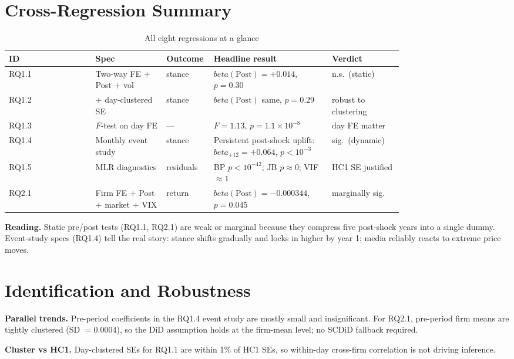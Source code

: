 \documentclass[11pt]{article}
\def\beta{beta}%
\begin{document}
\section*{Cross-Regression Summary}\label{sec:summary}
\begin{table}[H]
\centering
\caption*{All eight regressions at a glance}
\renewcommand{\arraystretch}{1.1}
\begin{tabular}{lp{0.18\linewidth}p{0.12\linewidth}p{0.30\linewidth}p{0.18\linewidth}}
\toprule
ID & Spec & Outcome & Headline result & Verdict \\
\midrule
RQ1.1 & Two-way FE + Post + vol & stance & $\beta(\text{Post}) = +0.014$, $p = 0.30$ & n.s.\ (static) \\
RQ1.2 & + day-clustered SE & stance & $\beta(\text{Post})$ same, $p = 0.29$ & robust to clustering \\
RQ1.3 & $F$-test on day FE & --- & $F = 1.13$, $p = 1.1 \times 10^{-8}$ & day FE matter \\
RQ1.4 & Monthly event study & stance & Persistent post-shock uplift: $\beta_{+12} = +0.064$, $p < 10^{-3}$ & sig.\ (dynamic) \\
RQ1.5 & MLR diagnostics & residuals & BP $p < 10^{-42}$; JB $p \approx 0$; VIF $\approx 1$ & HC1 SE justified \\
RQ2.1 & Firm FE + Post + market + VIX & return & $\beta(\text{Post}) = -0.000344$, $p = 0.045$ & marginally sig. \\
\bottomrule
\end{tabular}
\end{table}

\textbf{Reading.} Static pre/post tests (RQ1.1, RQ2.1) are weak or marginal because they compress five post-shock years into a single dummy. Event-study specs (RQ1.4) tell the real story: stance shifts gradually and locks in higher by year 1; media reliably reacts to extreme price moves.

\section*{Identification and Robustness}\label{sec:robustness}
\textbf{Parallel trends.} Pre-period coefficients in the RQ1.4 event study are mostly small and insignificant. For RQ2.1, pre-period firm means are tightly clustered (SD $= 0.0004$), so the DiD assumption holds at the firm-mean level; no SCDiD fallback required.

\textbf{Cluster vs HC1.} Day-clustered SEs for RQ1.1 are within 1\% of HC1 SEs, so within-day cross-firm correlation is not driving inference.
\end{document}
